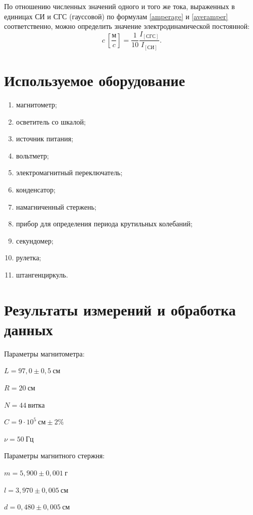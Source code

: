 \documentclass[a4paper, 12pt]{article}
\begin{document}
По отношению численных значений одного и того же тока, выраженных в единицах СИ и СГС (гауссовой) по формулам \eqref{amperage} и \eqref{averamper} соответственно, можно определить значение электродинамической постоянной:
\begin{equation}\label{electroconst}
c~\scriptstyle{\left[\frac{м}{c}\right]}\displaystyle = \frac{1}{10}\frac{I_{[СГС]}}{I_{[СИ]}}.
\end{equation}

\section{Используемое оборудование}

\begin{enumerate}
    \item магнитометр;
    \item осветитель со шкалой;
    \item источник питания;
    \item вольтметр;
    \item электромагнитный переключатель;
    \item конденсатор;
    \item намагниченный стержень;
    \item прибор для определения периода крутильных колебаний;
    \item секундомер;
    \item рулетка;
    \item штангенциркуль.
\end{enumerate}

\section{Результаты измерений и обработка данных}

Параметры магнитометра:
\begin{description}
\item{} $L = 97,0\pm0,5~см$
\item{} $R = 20~см$
\item{} $N = 44~витка$
\item{} $C = 9\cdot10^5~см\pm2\%$
\item{} $\nu = 50~Гц$
\end{description}

Параметры магнитного стержня:
\begin{description}
\item{} $m = 5,900\pm0,001~г$
\item{} $l = 3,970\pm0,005~см$
\item{} $d = 0,480\pm0,005~см$
\end{description}
\end{document}
